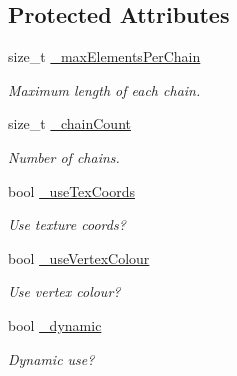 \subsection*{Protected Attributes}
\begin{DoxyCompactItemize}
\item 
\mbox{\label{classPUBillboardChain_a8d3a6a9bd7d145efa787e92feeff21e1}} 
size\+\_\+t \hyperlink{classPUBillboardChain_a8d3a6a9bd7d145efa787e92feeff21e1}{\+\_\+max\+Elements\+Per\+Chain}
\begin{DoxyCompactList}\small\item\em Maximum length of each chain. \end{DoxyCompactList}\item 
\mbox{\label{classPUBillboardChain_a76d251f9099a6ee773721dae84f34ebb}} 
size\+\_\+t \hyperlink{classPUBillboardChain_a76d251f9099a6ee773721dae84f34ebb}{\+\_\+chain\+Count}
\begin{DoxyCompactList}\small\item\em Number of chains. \end{DoxyCompactList}\item 
\mbox{\label{classPUBillboardChain_a1e78f4760195f41bddf1b0ecdb68f071}} 
bool \hyperlink{classPUBillboardChain_a1e78f4760195f41bddf1b0ecdb68f071}{\+\_\+use\+Tex\+Coords}
\begin{DoxyCompactList}\small\item\em Use texture coords? \end{DoxyCompactList}\item 
\mbox{\label{classPUBillboardChain_acdeceea7765d9578ac7747311988ceda}} 
bool \hyperlink{classPUBillboardChain_acdeceea7765d9578ac7747311988ceda}{\+\_\+use\+Vertex\+Colour}
\begin{DoxyCompactList}\small\item\em Use vertex colour? \end{DoxyCompactList}\item 
\mbox{\label{classPUBillboardChain_a5120ec526ae5c52fa4d1d31d7fcbcc4a}} 
bool \hyperlink{classPUBillboardChain_a5120ec526ae5c52fa4d1d31d7fcbcc4a}{\+\_\+dynamic}
\begin{DoxyCompactList}\small\item\em Dynamic use? \end{DoxyCompactList}\item 

\end{DoxyCompactItemize}
